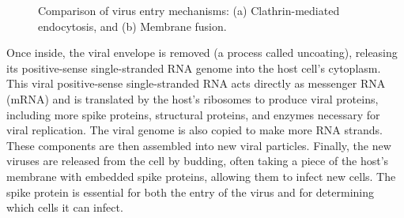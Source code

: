 \documentclass[12pt]{article}
\begin{document}
\begin{flushleft}
\begin{figure}[htbp]
  \centering
  \begin{subfigure}[t]{0.45\textwidth}
    \centering
  \end{subfigure}
  \hfill
  \begin{subfigure}[t]{0.45\textwidth}
    \centering
  \end{subfigure}

  \caption{Comparison of virus entry mechanisms: (a) Clathrin-mediated endocytosis, and (b) Membrane fusion.}
  \label{fig:sidebyside}
\end{figure}


Once inside, the viral envelope is removed (a process called uncoating), releasing its positive-sense single-stranded RNA genome into the host cell’s cytoplasm. This viral positive-sense single-stranded RNA acts directly as messenger RNA (mRNA) and is translated by the host's ribosomes to produce viral proteins, including more spike proteins, structural proteins, and enzymes necessary for viral replication. The viral genome is also copied to make more RNA strands. These components are then assembled into new viral particles. Finally, the new viruses are released from the cell by budding, often taking a piece of the host’s membrane with embedded spike proteins, allowing them to infect new cells. The spike protein is essential for both the entry of the virus and for determining which cells it can infect.

\end{flushleft}
\end{document}
